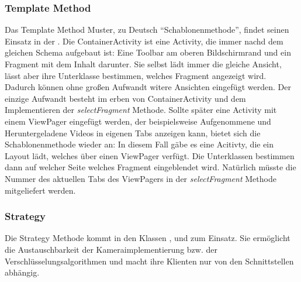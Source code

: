 \subsubsection{Template Method}
Das Template Method Muster, zu Deutsch ``Schablonenmethode'', findet seinen Einsatz in der . Die ContainerActivity ist eine Activity, die immer nachd dem gleichen Schema aufgebaut ist: Eine Toolbar am oberen Bildschirmrand und ein Fragment mit dem Inhalt darunter. Sie selbst lädt immer die gleiche Ansicht, lässt aber ihre Unterklasse bestimmen, welches Fragment angezeigt wird. Dadurch können ohne großen Aufwandt witere Ansichten eingefügt werden. Der einzige Aufwandt besteht im erben von ContainerActivity und dem Implementieren der \textit{selectFragment} Methode.\newline
Sollte später eine Activity mit einem ViewPager eingefügt werden, der beispielsweise Aufgenommene und Heruntergeladene Videos in eigenen Tabs anzeigen kann, bietet sich die Schablonenmethode wieder an: In diesem Fall gäbe es eine Acitivty, die ein Layout lädt, welches über einen ViewPager verfügt. Die Unterklassen bestimmen dann auf welcher Seite welches Fragment eingeblendet wird. Natürlich müsste die Nummer des aktuellen Tabs des ViewPagers in der \textit{selectFragment} Methode mitgeliefert werden.

\subsubsection{Strategy}
Die Strategy Methode kommt in den Klassen ,  und   zum Einsatz. Sie ermöglicht die Austauschbarkeit der Kameraimplementierung bzw. der Verschlüsselungsalgorithmen und macht ihre Klienten nur von den Schnittstellen abhängig.
